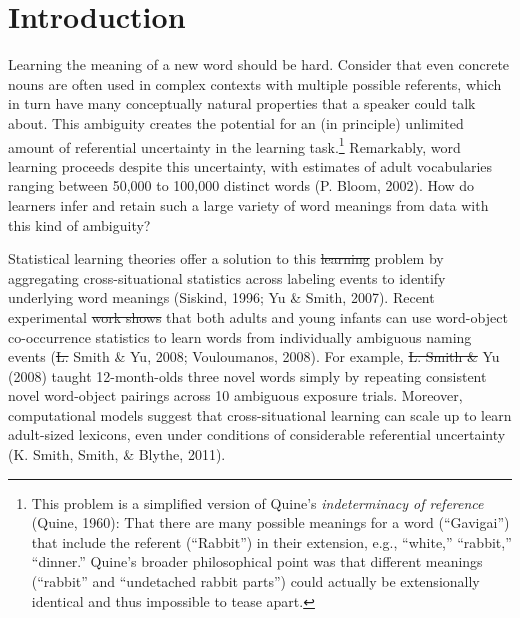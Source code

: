 \documentclass[authoryear, review]{elsarticle}
\providecommand{\DIFaddtex}[1]{{\protect\color{blue}\uwave{#1}}} %
\providecommand{\DIFdeltex}[1]{{\protect\color{red}\sout{#1}}}                      %
\providecommand{\DIFaddbegin}{} %
\providecommand{\DIFaddend}{} %
\providecommand{\DIFdelbegin}{} %
\providecommand{\DIFdelend}{} %
\providecommand{\DIFadd}[1]{\texorpdfstring{\DIFaddtex{#1}}{#1}} %
\providecommand{\DIFdel}[1]{\texorpdfstring{\DIFdeltex{#1}}{}} %
\begin{document}
\DIFaddbegin \newpage

\DIFaddend \section{Introduction}\label{introduction}

Learning the meaning of a new word should be hard. Consider that even
concrete nouns are often used in complex contexts with multiple possible
referents, which in turn have many conceptually natural properties that
a speaker could talk about. This ambiguity creates the potential for an
(in principle) unlimited amount of referential uncertainty in the
learning task.\footnote{This problem is a simplified version of Quine's
  \textit{indeterminacy of reference} (Quine, 1960): That there are many
  possible meanings for a word (``Gavigai'') that include the referent
  (``Rabbit'') in their extension, e.g., ``white,'' ``rabbit,''
  ``dinner.'' Quine's broader philosophical point was that different
  meanings (``rabbit'' and ``undetached rabbit parts'') could actually
  be extensionally identical and thus impossible to tease apart.}
Remarkably, word learning proceeds despite this uncertainty, with
estimates of adult vocabularies ranging between 50,000 to 100,000
distinct words (P. Bloom, 2002). How do learners infer and retain such a
large variety of word meanings from data with this kind of ambiguity?

Statistical learning theories offer a solution to this \DIFdelbegin \DIFdel{learning }\DIFdelend problem by
aggregating cross-situational statistics across labeling events to
identify underlying word meanings (Siskind, 1996; Yu \& Smith, 2007).
Recent experimental \DIFdelbegin \DIFdel{work shows }\DIFdelend \DIFaddbegin \DIFadd{has shown }\DIFaddend that both adults and young infants can use
word-object co-occurrence statistics to learn words from individually
ambiguous naming events (\DIFdelbegin \DIFdel{L. }\DIFdelend Smith \& Yu, 2008; Vouloumanos, 2008). For
example, \DIFdelbegin \DIFdel{L. Smith \& }\DIFdelend \DIFaddbegin \DIFadd{Smith and }\DIFaddend Yu (2008) taught 12-month-olds three novel words
simply by repeating consistent novel word-object pairings across 10
ambiguous exposure trials. Moreover, computational models suggest that
cross-situational learning can scale up to learn adult-sized lexicons,
even under conditions of considerable referential uncertainty (K. Smith,
Smith, \& Blythe, 2011).
\end{document}
